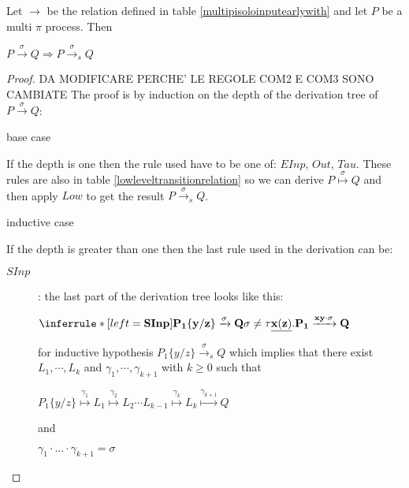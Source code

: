\begin{proposition}
  Let $\rightarrow$ be the relation defined in table \ref{multipisoloinputearlywith} and let $P$ be a multi $\pi$ process. Then 
  \begin{center}
    $P\xrightarrow{\sigma} Q \Rightarrow P\xrightarrow{\sigma}_{s} Q$
  \end{center}
  \begin{proof}
    DA MODIFICARE PERCHE' LE REGOLE COM2 E COM3 SONO CAMBIATE 
    The proof is by induction on the depth of the derivation tree of $P\xrightarrow{\sigma} Q$:
    \begin{description}
      \item[base case]
    \end{description}
	If the depth is one then the rule used have to be one of: $EInp$, $Out$, $Tau$. These rules are also in table \ref{lowleveltransitionrelation} so we can derive $P \stackrel{\sigma}{\longmapsto} Q$ and then apply $Low$ to get the result $P\xrightarrow{\sigma}_{s} Q$.
    \begin{description}
      \item[inductive case]
    \end{description}
	If the depth is greater than one then the last rule used in the derivation can be:
	\begin{description}
	  \item[$SInp$]: 
	    the last part of the derivation tree looks like this:
	    \begin{center}
	      $\inferrule* [left=\bf{SInp}]{
		  P_{1}\{y/z\} \xrightarrow{\sigma} Q
		\\
		  \sigma\neq \tau
	      }{
		\underline{x(z)}.P_{1} \xrightarrow{xy \cdot \sigma} Q
	      }$	      
	    \end{center}
	    for inductive hypothesis $P_{1}\{y/z\} \xrightarrow{\sigma}_{s} Q$ which implies that there exist $L_{1}, \cdots, L_{k}$ and $\gamma_{1}, \cdots, \gamma_{k+1}$ with $k\geq 0$ such that 
	    \begin{center}
	      $P_{1}\{y/z\} \stackrel{\gamma_{1}}{\longmapsto} L_{1}  \stackrel{\gamma_{2}}{\longmapsto} L_{2} \cdots L_{k-1} \stackrel{\gamma_{k}}{\longmapsto} L_{k} \stackrel{\gamma_{k+1}}{\longmapsto} Q$ 
	    \end{center}
	    and 
	    \begin{center}
	      $\gamma_{1} \cdot \ldots \cdot \gamma_{k+1} =  \sigma$
	    \end{center}

\end{description}
\end{proof}
\end{proposition}
